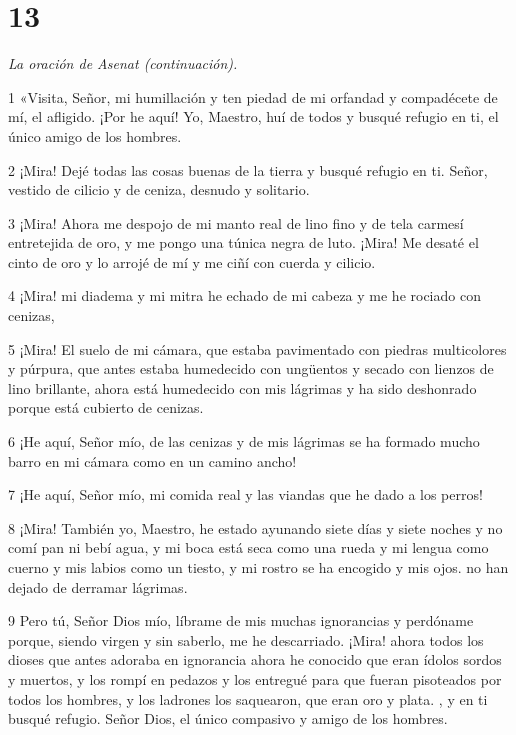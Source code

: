 \chapter{13}

\par \textit{La oración de Asenat (continuación).}

\par 1 «Visita, Señor, mi humillación y ten piedad de mi orfandad y compadécete de mí, el afligido. ¡Por he aquí! Yo, Maestro, huí de todos y busqué refugio en ti, el único amigo de los hombres.

\par 2 ¡Mira! Dejé todas las cosas buenas de la tierra y busqué refugio en ti. Señor, vestido de cilicio y de ceniza, desnudo y solitario.

\par 3 ¡Mira! Ahora me despojo de mi manto real de lino fino y de tela carmesí entretejida de oro, y me pongo una túnica negra de luto. ¡Mira! Me desaté el cinto de oro y lo arrojé de mí y me ciñí con cuerda y cilicio.

\par 4 ¡Mira! mi diadema y mi mitra he echado de mi cabeza y me he rociado con cenizas,

\par 5 ¡Mira! El suelo de mi cámara, que estaba pavimentado con piedras multicolores y púrpura, que antes estaba humedecido con ungüentos y secado con lienzos de lino brillante, ahora está humedecido con mis lágrimas y ha sido deshonrado porque está cubierto de cenizas.

\par 6 ¡He aquí, Señor mío, de las cenizas y de mis lágrimas se ha formado mucho barro en mi cámara como en un camino ancho!

\par 7 ¡He aquí, Señor mío, mi comida real y las viandas que he dado a los perros!

\par 8 ¡Mira! También yo, Maestro, he estado ayunando siete días y siete noches y no comí pan ni bebí agua, y mi boca está seca como una rueda y mi lengua como cuerno y mis labios como un tiesto, y mi rostro se ha encogido y mis ojos. no han dejado de derramar lágrimas.

\par 9 Pero tú, Señor Dios mío, líbrame de mis muchas ignorancias y perdóname porque, siendo virgen y sin saberlo, me he descarriado. ¡Mira! ahora todos los dioses que antes adoraba en ignorancia ahora he conocido que eran ídolos sordos y muertos, y los rompí en pedazos y los entregué para que fueran pisoteados por todos los hombres, y los ladrones los saquearon, que eran oro y plata. , y en ti busqué refugio. Señor Dios, el único compasivo y amigo de los hombres.

